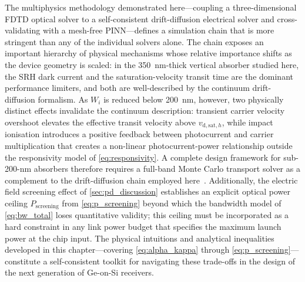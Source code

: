 
The multiphysics methodology demonstrated here—coupling a three-dimensional
FDTD optical solver to a self-consistent drift-diffusion electrical solver and
cross-validating with a mesh-free PINN—defines a simulation chain that is
more stringent than any of the individual solvers alone. The chain exposes an
important hierarchy of physical mechanisms whose relative importance shifts as
the device geometry is scaled: in the \SI{350}{\nano\metre}-thick vertical
absorber studied here, the SRH dark current and the saturation-velocity
transit time are the dominant performance limiters, and both are well-described
by the continuum drift-diffusion formalism. As $W_i$ is reduced below
\SI{200}{\nano\metre}, however, two physically distinct effects invalidate the
continuum description: transient carrier velocity overshoot elevates the
effective transit velocity above $v_{\mathrm{d,sat},h}$, while impact
ionisation introduces a positive feedback between photocurrent and carrier
multiplication that creates a non-linear photocurrent-power relationship
outside the responsivity model of \cref{eq:responsivity}. A complete design
framework for sub-200-nm absorbers therefore requires a full-band Monte Carlo
transport solver as a complement to the drift-diffusion chain employed
here~\cite{Alasio2024}. Additionally, the electric field screening effect of
\cref{sec:pd_discussion} establishes an explicit optical power ceiling
$P_{\mathrm{screening}}$ from \cref{eq:p_screening} beyond which the
bandwidth model of \cref{eq:bw_total} loses quantitative validity; this
ceiling must be incorporated as a hard constraint in any link power budget
that specifies the maximum launch power at the chip input. The physical
intuitions and analytical inequalities developed in this chapter—covering
\cref{eq:alpha_kappa} through \cref{eq:p_screening}—constitute a
self-consistent toolkit for navigating these trade-offs in the design of the
next generation of Ge-on-Si receivers.



